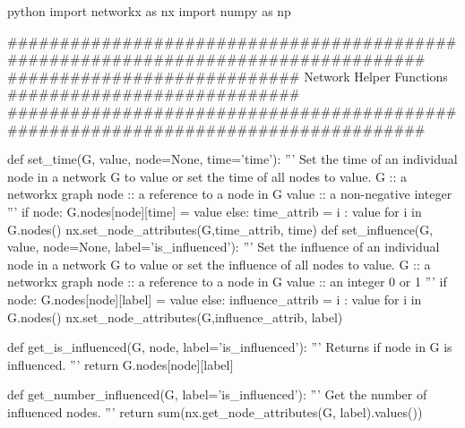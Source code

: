 \documentclass[10pt, oneside, reqno]{amsart}
\theoremstyle{plain}%
\theoremstyle{definition}
\theoremstyle{remark}
\begin{document}
\newpage 
\begin{mintedbox}{python}
import networkx as nx
import numpy as np

###################################################################################
############################ Network Helper Functions  ############################
###################################################################################

def set_time(G, value, node=None, time='time'):
    '''
        Set the time of an individual node in a network G 
        to value or set the time of all nodes to value.
        G      ::  a networkx graph
        node   ::  a reference to a node in G
        value  ::  a non-negative integer
    '''
    if node:
        G.nodes[node][time] = value
    else:
        time_attrib = {i : value for i in G.nodes()}
        nx.set_node_attributes(G,time_attrib, time)
def set_influence(G, value, node=None, label='is_influenced'):
    '''
        Set the influence of an individual node in a network G 
        to value or set the influence of all nodes to value.
        G      ::  a networkx graph
        node   ::  a reference to a node in G
        value  ::  an integer 0 or 1
    '''
    if node:
        G.nodes[node][label] = value
    else:
        influence_attrib = { i : value for i in G.nodes() }
        nx.set_node_attributes(G,influence_attrib, label)
        
def get_is_influenced(G, node, label='is_influenced'):
    '''
        Returns if node in G is influenced.
    '''
    return G.nodes[node][label]
        
def get_number_influenced(G, label='is_influenced'):
    '''
        Get the number of influenced nodes.
    '''
    return sum(nx.get_node_attributes(G, label).values())

\end{mintedbox}
\end{document}
